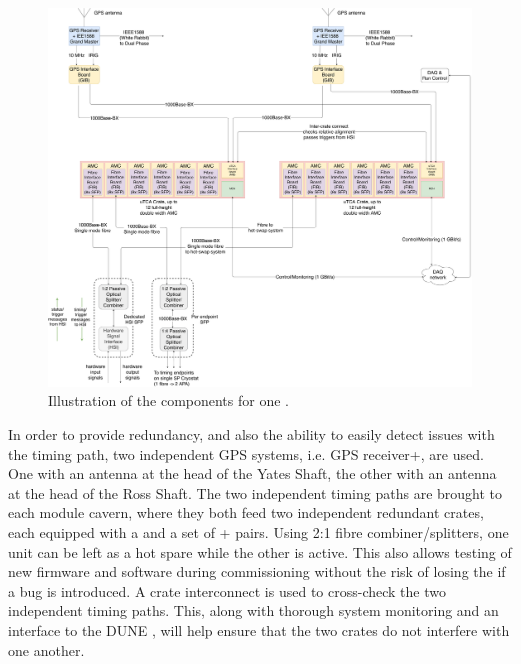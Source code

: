 \documentclass{dune}
\begin{document}
\begin{figure}[h]
\includegraphics[width=\textwidth]{DUNE_SP_Timing_DAQ_on_CryoM_GPS_In_CUC_01april20.pdf}
\caption{Illustration of the  components for one  .}
\label{fig:daq-readout-timing}
\end{figure}

In order to provide redundancy, and also the ability to easily detect issues with the timing path, two independent GPS systems, i.e. GPS receiver+, are used. One with an antenna at the head of the Yates Shaft, the other with an antenna at the head of the Ross Shaft. The two independent timing paths are brought to each module cavern, where they both feed two independent redundant  crates, each equipped with a  and a set of + pairs. Using 2:1 fibre combiner/splitters, one  unit can be left as a hot spare while the other is active. This also allows testing of new firmware and software during commissioning without the risk of losing the  if a bug is introduced. A  crate interconnect is used to cross-check the two independent timing paths. This, along with thorough system monitoring and an interface to the DUNE , will help ensure that the two  crates do not interfere with one another.
\end{document}
